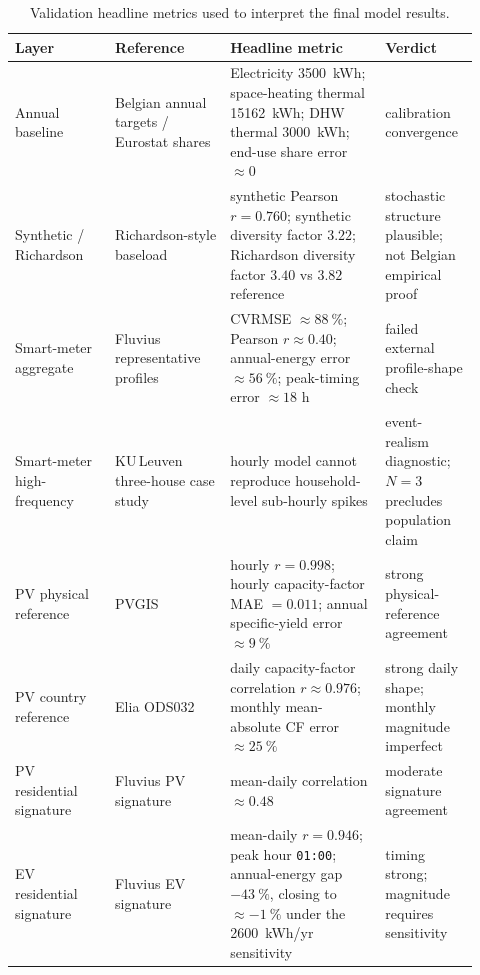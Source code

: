 \begin{table}[ht]
  \centering
  \footnotesize
  \caption{Validation headline metrics used to interpret the final model results.}
  \label{tab:validation_results_summary}
  \begin{tabular}{@{}p{0.20\linewidth} p{0.23\linewidth}
                  p{0.31\linewidth} p{0.18\linewidth}@{}}
    \toprule
    \textbf{Layer} & \textbf{Reference} &
      \textbf{Headline metric} & \textbf{Verdict} \\
    \midrule
    Annual baseline
      & Belgian annual targets / Eurostat shares
        \cite{eurostat_disaggregated_nodate}
      & Electricity \SI{3500}{kWh}; space-heating thermal
        \SI{15162}{kWh}; DHW thermal \SI{3000}{kWh};
        end-use share error $\approx 0$
      & calibration convergence\\
    Synthetic / Richardson
      & Richardson-style baseload
        \cite{Richardson2010CRESTElectricity}
      & synthetic Pearson $r=0.760$; synthetic diversity factor $3.22$;
        Richardson diversity factor $3.40$ vs $3.82$ reference
      & stochastic structure plausible; not Belgian empirical proof \\
    Smart-meter aggregate
      & Fluvius representative profiles \cite{Fluvius2024OpenData}
      & CVRMSE $\approx \SI{88}{\percent}$; Pearson $r \approx 0.40$;
        annual-energy error $\approx \SI{56}{\percent}$;
        peak-timing error $\approx 18$ h
      & failed external profile-shape check\\
    Smart-meter high-frequency
      & KU\,Leuven three-house case study \cite{KULeuven3House}
      & hourly model cannot reproduce household-level sub-hourly spikes
      & event-realism diagnostic; $N=3$ precludes population claim \\
    PV physical reference
      & PVGIS \cite{Huld2012PVGIS}
      & hourly $r=0.998$; hourly capacity-factor MAE $=0.011$;
        annual specific-yield error $\approx \SI{9}{\percent}$
      & strong physical-reference agreement \\
    PV country reference
      & Elia ODS032 \cite{Elia2024PVODS032}
      & daily capacity-factor correlation $r \approx 0.976$;
        monthly mean-absolute CF error $\approx \SI{25}{\percent}$
      & strong daily shape; monthly magnitude imperfect \\
    PV residential signature
      & Fluvius PV signature \cite{Fluvius2024OpenData}
      & mean-daily correlation $\approx 0.48$
      & moderate signature agreement \\
    EV residential signature
      & Fluvius EV signature \cite{Fluvius2024OpenData}
      & mean-daily $r=0.946$; peak hour \texttt{01:00};
        annual-energy gap $-\SI{43}{\percent}$, closing to
        $\approx -\SI{1}{\percent}$ under the \SI{2600}{kWh/yr} sensitivity
      & timing strong; magnitude requires sensitivity \\
    \bottomrule
  \end{tabular}
\end{table}

